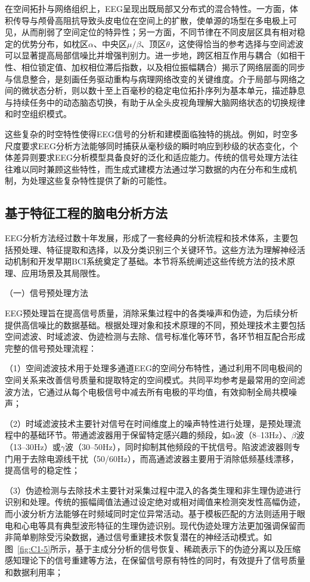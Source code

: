 在空间拓扑与网络组织上，EEG呈现出既局部又分布式的混合特性。一方面，体积传导与颅骨高阻抗导致头皮电位在空间上的扩散，使单源的场型在多电极上可见，从而削弱了空间定位的特异性；另一方面，不同节律在不同皮层区具有相对稳定的优势分布，如枕区$\alpha$、中央区$\mu/\beta$、顶区$\theta$，这使得恰当的参考选择与空间滤波可以显著提高局部信噪比并增强判别力。进一步地，跨区相互作用与耦合（如相干性、相位锁定值、加权相位滞后指数，以及相位振幅耦合）揭示了网络层面的同步与信息整合，是刻画任务驱动重构与病理网络改变的关键维度。介于局部与网络之间的微状态分析，则以数十至上百毫秒的稳定电位拓扑序列为基本单元，描述静息与持续任务中的动态脑态切换，有助于从全头皮视角理解大脑网络状态的切换规律和时空组织模式。

这些复杂的时空特性使得EEG信号的分析和建模面临独特的挑战。例如，时空多尺度要求EEG分析方法能够同时捕获从毫秒级的瞬时响应到秒级的状态变化，个体差异则要求EEG分析模型具备良好的泛化和适应能力。传统的信号处理方法往往难以同时兼顾这些特性，而生成式建模方法通过学习数据的内在分布和生成机制，为处理这些复杂特性提供了新的可能性。

\subsection{基于特征工程的脑电分析方法}
EEG分析方法经过数十年发展，形成了一套经典的分析流程和技术体系，主要包括预处理、特征提取和选择，以及分类识别三个关键环节。这些方法为理解神经活动机制和开发早期BCI系统奠定了基础。本节将系统阐述这些传统方法的技术原理、应用场景及其局限性。

（一）信号预处理方法

EEG预处理旨在提高信号质量，消除采集过程中的各类噪声和伪迹，为后续分析提供高信噪比的数据基础。根据处理对象和技术原理的不同，预处理技术主要包括空间滤波、时域滤波、伪迹检测与去除、信号标准化等环节，各环节相互配合形成完整的信号预处理流程：


（1）空间滤波技术用于处理多通道EEG的空间分布特性，通过利用不同电极间的空间关系来改善信号质量和提取特定的空间模式。共同平均参考是最常用的空间滤波方法，它通过从每个电极信号中减去所有电极的平均值，有效抑制全局共模噪声\cite{offner1950eeg}；

（2）时域滤波技术主要针对信号在时间维度上的噪声特性进行处理，是预处理流程中的基础环节。带通滤波器用于保留特定感兴趣的频段，如$\alpha$波（8--13Hz）、$\beta$波（13--30Hz）或$\gamma$波（30--50Hz），同时抑制其他频段的干扰信号。陷波滤波器则专门用于去除电源线干扰（50/60Hz），而高通滤波器主要用于消除低频基线漂移，提高信号的稳定性\cite{picton2000guidelines}；

（3）伪迹检测与去除技术主要针对采集过程中混入的各类生理和非生理伪迹进行识别和处理\cite{sweeney2012artifact}。传统的振幅阈值法通过设定绝对或相对阈值来检测突发性高幅伪迹，而小波分析方法能够在时频域同时定位异常活动。基于模板匹配的方法则适用于眼电和心电等具有典型波形特征的生理伪迹识别。现代伪迹处理方法更加强调保留而非简单剔除受污染数据，通过信号重建技术恢复潜在的神经活动模式。如图~\ref{fig:C1-5}所示，基于主成分分析的信号恢复、稀疏表示下的伪迹分离以及压缩感知理论下的信号重建等方法，在保留信号原有特性的同时，有效提升了信号质量和数据利用率；

